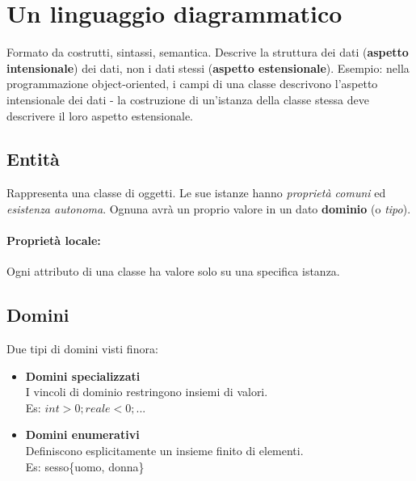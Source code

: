 \section{Un linguaggio diagrammatico}
Formato da costrutti, sintassi, semantica.
Descrive la struttura dei dati (\textbf{aspetto intensionale}) dei dati, non i dati stessi (\textbf{aspetto estensionale}).
Esempio: nella programmazione object-oriented, i campi di una classe descrivono l'aspetto intensionale dei dati - la costruzione di un'istanza della classe stessa deve descrivere il loro aspetto estensionale.

\subsection{Entità}
Rappresenta una classe di oggetti.
Le sue istanze hanno \textit{proprietà comuni} ed \textit{esistenza autonoma}. Ognuna avrà un proprio valore in un dato \textbf{dominio} (o \textit{tipo}). \\
\paragraph{Proprietà locale:} Ogni attributo di una classe ha valore solo su una specifica istanza.

\subsection{Domini}
Due tipi di domini visti finora:
\begin{itemize}
	\item \textbf{Domini specializzati} \hfill \\ I vincoli di dominio restringono insiemi di valori.\\
	Es: $int > 0; reale < 0; ...$
	\item \textbf{Domini enumerativi} \hfill \\ Definiscono esplicitamente un insieme finito di elementi.\\
	Es: sesso\{uomo, donna\}
\end{itemize}
